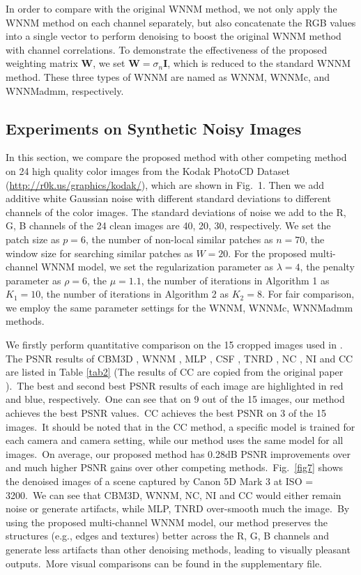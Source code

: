 \documentclass[10pt,twocolumn,letterpaper]{article}
\begin{document}
In order to compare with the original WNNM method, we not only apply the WNNM method on each channel separately, but also concatenate the RGB values into a single vector to perform denoising to boost the original WNNM method with channel correlations. To demonstrate the effectiveness of the proposed weighting matrix $\mathbf{W}$, we set $\mathbf{W}=\sigma_{n}\mathbf{I}$, which is reduced to the standard WNNM method. These three types of WNNM are named as WNNM, WNNMc, and WNNMadmm, respectively.

\subsection{Experiments on Synthetic Noisy Images}
In this section, we compare the proposed method with other competing method \cite{cbm3d,mlp,wnnm,csf,chen2015learning,noiseclinic,neatimage}
on 24 high quality color images from the Kodak PhotoCD Dataset (\url{http://r0k.us/graphics/kodak/}), which are shown in Fig.\ 1. Then we add additive white Gaussian noise with different standard deviations to different channels of the color images. The standard deviations of noise we add to the R, G, B channels of the 24 clean images are 40, 20, 30, respectively.  We set the patch size as $p = 6$, the number of non-local similar patches as $n = 70$, the window size for searching similar patches as $W = 20$. For the proposed multi-channel WNNM model, we set the regularization parameter as $\lambda=4$, the penalty parameter as $\rho=6$, the $\mu=1.1$, the number of iterations in Algorithm 1 as $K_{1} = 10$, the number of iterations in Algorithm 2 as $K_{2}=8$. For fair comparison, we employ the same parameter settings for the WNNM, WNNMc, WNNMadmm methods.

We firstly perform quantitative comparison on the 15 cropped images used in \cite{crosschannel2016}. The PSNR results of CBM3D \cite{bm3d}, WNNM \cite{wnnm}, MLP \cite{mlp}, CSF \cite{csf}, TNRD \cite{chen2015learning}, NC \cite{noiseclinic,ncwebsite}, NI \cite{neatimage} and
CC \cite{crosschannel2016} are listed in Table \ref{tab2} (The results of CC are copied from the original paper \cite{crosschannel2016}).\ The best and second best PSNR results of each image are highlighted in red and blue, respectively.\ One can see that on 9 out of the 15 images, our method achieves the best PSNR values.\ CC achieves the best PSNR on 3 of the 15 images.\ It should be noted that in the CC method, a specific model is trained for each camera and camera setting, while our method uses the same model for all images.\ On average, our proposed method has 0.28dB PSNR improvements over \cite{crosschannel2016} and much higher PSNR gains over other competing methods.\ Fig.\ \ref{fig7} shows the denoised images of a scene captured by Canon 5D Mark 3 at ISO = 3200.\ We can see that CBM3D, WNNM, NC, NI and CC would either remain noise or generate artifacts, while MLP, TNRD over-smooth much the image.\ By using the proposed multi-channel WNNM model, our method preserves the structures (e.g., edges and textures) better across the R, G, B channels and generate less artifacts than other denoising methods, leading to visually pleasant outputs.\ More visual comparisons can be found in the supplementary file.
\end{document}
